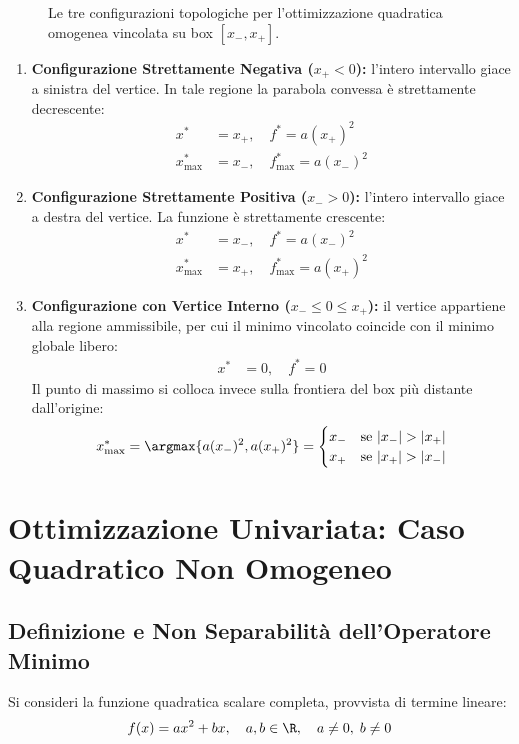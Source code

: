 \begin{figure}[H]
{\begin{tikzpicture}[>=Stealth, font=\small]
\end{tikzpicture}%
}
\caption{Le tre configurazioni topologiche per l'ottimizzazione quadratica omogenea vincolata su box $[x_-, x_+]$.}
\label{fig:parabola-casi-box}
\end{figure}

\begin{enumerate}
    \item \textbf{Configurazione Strettamente Negativa ($x_+ < 0$):} l'intero intervallo giace a sinistra del vertice. In tale regione la parabola convessa \`e strettamente decrescente:
    \begin{align}
    x^* &= x_+, \quad f^* = a (x_+)^2 \\
    x^*_{\max} &= x_-, \quad f^*_{\max} = a (x_-)^2
    \end{align}
    \item \textbf{Configurazione Strettamente Positiva ($x_- > 0$):} l'intero intervallo giace a destra del vertice. La funzione \`e strettamente crescente:
    \begin{align}
    x^* &= x_-, \quad f^* = a (x_-)^2 \\
    x^*_{\max} &= x_+, \quad f^*_{\max} = a (x_+)^2
    \end{align}
    \item \textbf{Configurazione con Vertice Interno ($x_- \le 0 \le x_+$):} il vertice appartiene alla regione ammissibile, per cui il minimo vincolato coincide con il minimo globale libero:
    \begin{align}
    x^* &= 0, \quad f^* = 0
    \end{align}
    Il punto di massimo si colloca invece sulla frontiera del box pi\`u distante dall'origine:
    \begin{equation}
    x^*_{\max} = \argmax \{ a(x_-)^2, a(x_+)^2 \} = \begin{cases} x_- & \text{se } |x_-| > |x_+| \\ x_+ & \text{se } |x_+| > |x_-| \end{cases}
    \end{equation}
\end{enumerate}


\FloatBarrier
\section{Ottimizzazione Univariata: Caso Quadratico Non Omogeneo}
\label{sec:opt-caso-quadratico-non-omogeneo}

\subsection{Definizione e Non Separabilit\`a dell'Operatore Minimo}
Si consideri la funzione quadratica scalare completa, provvista di termine lineare:
\begin{equation}
f(x) = ax^2 + bx, \quad a, b \in \R, \quad a \neq 0, \; b \neq 0
\end{equation}

